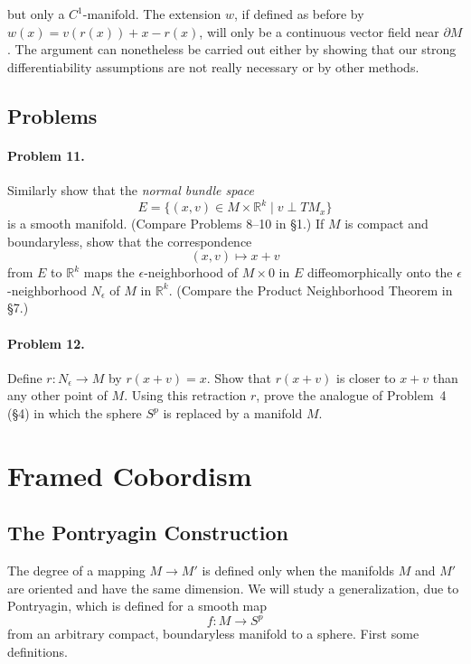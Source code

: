 
but only a $C^1$-manifold. The extension $w$, if defined as before by $w(x) = v(r(x)) + x - r(x)$, will only be a continuous vector field near $\partial M$. The argument can nonetheless be carried out either by showing that our strong differentiability assumptions are not really necessary or by other methods.

\subsection*{Problems}

\paragraph{Problem 11.}
Similarly show that the \emph{normal bundle space}
\[
E = \{(x, v) \in M \times \mathbb{R}^k \mid v \perp TM_x\}
\]
is a smooth manifold. (Compare Problems 8--10 in \S1.) If $M$ is compact and boundaryless, show that the correspondence
\[
(x, v) \mapsto x + v
\]
from $E$ to $\mathbb{R}^k$ maps the $\epsilon$-neighborhood of $M \times 0$ in $E$ diffeomorphically onto the $\epsilon$-neighborhood $N_\epsilon$ of $M$ in $\mathbb{R}^k$. (Compare the Product Neighborhood Theorem in \S7.)

\paragraph{Problem 12.}
Define $r : N_\epsilon \to M$ by $r(x + v) = x$. Show that $r(x + v)$ is closer to $x + v$ than any other point of $M$. Using this retraction $r$, prove the analogue of Problem~4 (\S4) in which the sphere $S^p$ is replaced by a manifold $M$.



\section{Framed Cobordism}

\subsection{The Pontryagin Construction}

The degree of a mapping $M \to M'$ is defined only when the manifolds $M$ and $M'$ are oriented and have the same dimension. We will study a generalization, due to Pontryagin, which is defined for a smooth map
\[
f : M \to S^p
\]
from an arbitrary compact, boundaryless manifold to a sphere. First some definitions.

